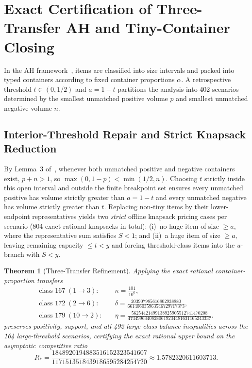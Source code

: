 \documentclass[11pt,letterpaper]{article}
\newtheorem{theorem}{Theorem}[section]
\theoremstyle{definition}
\theoremstyle{remark}
\begin{document}
\section{Exact Certification of Three-Transfer AH and Tiny-Container Closing}\label{sec:local-cert}
In the AH framework~\cite{Balogh2018AH}, items are classified into size intervals and packed into typed containers according to fixed container proportions $\alpha$. A retrospective threshold $t \in (0,1/2)$ and $a = 1-t$ partitions the analysis into 402 scenarios determined by the smallest unmatched positive volume $p$ and smallest unmatched negative volume $n$.

\subsection{Interior-Threshold Repair and Strict Knapsack Reduction}
By Lemma~3 of~\cite{Balogh2018AH}, whenever both unmatched positive and negative containers exist, $p + n > 1$, so $\max(0, 1-p) < \min(1/2, n)$. Choosing $t$ strictly inside this open interval and outside the finite breakpoint set ensures every unmatched positive has volume strictly greater than $a=1-t$ and every unmatched negative has volume strictly greater than $t$. Replacing non-tiny items by their lower-endpoint representatives yields two \emph{strict} offline knapsack pricing cases per scenario (804 exact rational knapsacks in total): (i)~no huge item of size $\ge a$, where the representative sum satisfies $S < 1$; and (ii)~a huge item of size $\ge a$, leaving remaining capacity $\le t < y$ and forcing threshold-class items into the $u$-branch with $S < y$.

\begin{theorem}[Three-Transfer Refinement]\label{thm:rstar}
Applying the exact rational container-proportion transfers
\[
\begin{aligned}
  \text{class } 167\;(1\!\to\! 3): &\quad \kappa = \frac{101}{10^6}, \\
  \text{class } 172\;(2\!\to\! 6): &\quad \delta = \frac{203907985616802938880}{661406035963546729717373}, \\
  \text{class } 179\;(10\!\to\! 2): &\quad \eta = \frac{56254421499138925905512741470208}{47449963408280619234481631165243337}.
\end{aligned}
\]
preserves positivity, support, and all 492 large-class balance inequalities across the 164 large-threshold scenarios, certifying the exact rational upper bound on the asymptotic competitive ratio
\[
  R_* = \frac{1848920194883516152323541607}{1171513518439186595284254720} \approx 1.5782320611603713.
\]
\end{theorem}
\end{document}

